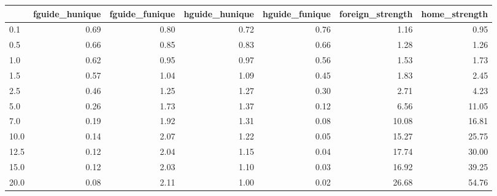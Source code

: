 \begin{tabular}{lrrrrrr}
\toprule
 & fguide_hunique & fguide_funique & hguide_hunique & hguide_funique & foreign_strength & home_strength \\
\midrule
0.1 & 0.69 & 0.80 & 0.72 & 0.76 & 1.16 & 0.95 \\
0.5 & 0.66 & 0.85 & 0.83 & 0.66 & 1.28 & 1.26 \\
1.0 & 0.62 & 0.95 & 0.97 & 0.56 & 1.53 & 1.73 \\
1.5 & 0.57 & 1.04 & 1.09 & 0.45 & 1.83 & 2.45 \\
2.5 & 0.46 & 1.25 & 1.27 & 0.30 & 2.71 & 4.23 \\
5.0 & 0.26 & 1.73 & 1.37 & 0.12 & 6.56 & 11.05 \\
7.0 & 0.19 & 1.92 & 1.31 & 0.08 & 10.08 & 16.81 \\
10.0 & 0.14 & 2.07 & 1.22 & 0.05 & 15.27 & 25.75 \\
12.5 & 0.12 & 2.04 & 1.15 & 0.04 & 17.74 & 30.00 \\
15.0 & 0.12 & 2.03 & 1.10 & 0.03 & 16.92 & 39.25 \\
20.0 & 0.08 & 2.11 & 1.00 & 0.02 & 26.68 & 54.76 \\
\bottomrule
\end{tabular}
